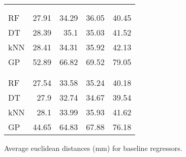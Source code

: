 \begin{margintable}
\begin{tabularx}{1\marginparwidth}{Xd{2.1}d{2.1}d{1.1}d{1.1}}
		&&    
		 &
		 &
		 \\
		\\
		\midrule
		RF & 27.91 & 34.29  & 36.05                      & 40.45 \\ 
		DT                  & 28.39                     & 35.1                       & 35.03  & 41.52 \\ 
		kNN                 & 28.41                     & 34.31                      & 35.92                      & 42.13 \\ 
		GP                  & 52.89                     & 66.82                      & 69.52                      & 79.05 \\ 
		\midrule
		&&    
		 &
		 &
		\\
		\\
		\midrule
		RF                  &27.54  & 33.58                       & 35.24                       & 40.18 \\ 
		DT &27.9                       & 32.74   & 34.67   & 39.54 \\ 
		kNN                 &28.1                       & 33.99                       & 35.93                       & 41.62 \\ 
		GP                  &44.65                      & 64.83                       & 67.88                       & 76.18 \\ 
		\bottomrule
	\end{tabularx}%
	\caption[Baseline data]{\small Average euclidean distances (mm) for baseline regressors.}
	\label{tab:baseline}
\end{margintable}

